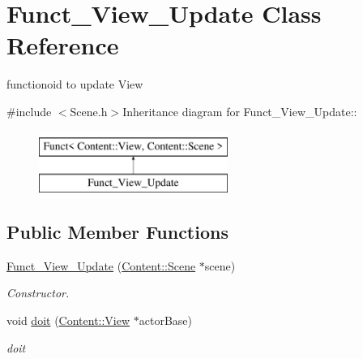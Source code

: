 \hypertarget{classFunct__View__Update}{
\section{Funct\_\-View\_\-Update Class Reference}
\label{classFunct__View__Update}
}


functionoid to update View  


{\ttfamily \#include $<$Scene.h$>$}Inheritance diagram for Funct\_\-View\_\-Update::\begin{figure}[H]
\begin{center}
\leavevmode
\includegraphics[height=2cm]{classFunct__View__Update}
\end{center}
\end{figure}
\subsection*{Public Member Functions}
\begin{DoxyCompactItemize}
\item 
\hypertarget{classFunct__View__Update_a6c1220dea5bd48bffde6f3b5df17fc18}{
\hyperlink{classFunct__View__Update_a6c1220dea5bd48bffde6f3b5df17fc18}{Funct\_\-View\_\-Update} (\hyperlink{classContent_1_1Scene}{Content::Scene} $\ast$scene)}
\label{classFunct__View__Update_a6c1220dea5bd48bffde6f3b5df17fc18}

\begin{DoxyCompactList}\small\item\em Constructor. \item\end{DoxyCompactList}\item 
\hypertarget{classFunct__View__Update_a4289f8940ebe45d3aff14b56526a7533}{
void \hyperlink{classFunct__View__Update_a4289f8940ebe45d3aff14b56526a7533}{doit} (\hyperlink{classContent_1_1View}{Content::View} $\ast$actorBase)}
\label{classFunct__View__Update_a4289f8940ebe45d3aff14b56526a7533}

\begin{DoxyCompactList}\small\item\em doit \item\end{DoxyCompactList}\end{DoxyCompactItemize}



